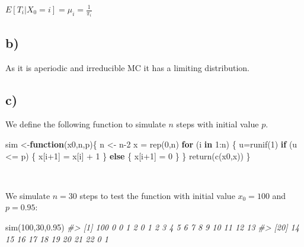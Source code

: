 \documentclass[
]{article}
\newenvironment{Shaded}{\begin{snugshade}}{\end{snugshade}}
\newcommand{\CommentTok}[1]{\textcolor[rgb]{0.56,0.35,0.01}{\textit{#1}}}
\newcommand{\ControlFlowTok}[1]{\textcolor[rgb]{0.13,0.29,0.53}{\textbf{#1}}}
\newcommand{\DecValTok}[1]{\textcolor[rgb]{0.00,0.00,0.81}{#1}}
\newcommand{\FloatTok}[1]{\textcolor[rgb]{0.00,0.00,0.81}{#1}}
\newcommand{\FunctionTok}[1]{\textcolor[rgb]{0.00,0.00,0.00}{#1}}
\newcommand{\NormalTok}[1]{#1}
\newcommand{\OtherTok}[1]{\textcolor[rgb]{0.56,0.35,0.01}{#1}}
\newcommand{\SpecialCharTok}[1]{\textcolor[rgb]{0.00,0.00,0.00}{#1}}
\begin{document}
\(E[T_{i}|X_{0} = i] = \mu_{i} = \frac{1}{\pi_{i}}\)

\hypertarget{b-1}{%
\subsection{b)}\label{b-1}}

As it is aperiodic and irreducible MC it has a limiting distribution.

\hypertarget{c-1}{%
\subsection{c)}\label{c-1}}

We define the following function to simulate \(n\) steps with initial
value \(p\).

\begin{Shaded}
\begin{Highlighting}[]
\NormalTok{sim }\OtherTok{\textless{}{-}}\ControlFlowTok{function}\NormalTok{(x0,n,p)\{ }
\NormalTok{    n }\OtherTok{\textless{}{-}}\NormalTok{ n}\DecValTok{{-}2}
\NormalTok{    x }\OtherTok{=} \FunctionTok{rep}\NormalTok{(}\DecValTok{0}\NormalTok{,n)}
    \ControlFlowTok{for}\NormalTok{ (i }\ControlFlowTok{in} \DecValTok{1}\SpecialCharTok{:}\NormalTok{n) \{}
\NormalTok{        u}\OtherTok{=}\FunctionTok{runif}\NormalTok{(}\DecValTok{1}\NormalTok{) }
        \ControlFlowTok{if}\NormalTok{ (u }\SpecialCharTok{\textless{}=}\NormalTok{ p) \{}
\NormalTok{            x[i}\SpecialCharTok{+}\DecValTok{1}\NormalTok{] }\OtherTok{=}\NormalTok{ x[i] }\SpecialCharTok{+} \DecValTok{1}
\NormalTok{        \} }\ControlFlowTok{else}\NormalTok{ \{}
\NormalTok{            x[i}\SpecialCharTok{+}\DecValTok{1}\NormalTok{] }\OtherTok{=} \DecValTok{0}
\NormalTok{        \}}
\NormalTok{    \} }
    \FunctionTok{return}\NormalTok{(}\FunctionTok{c}\NormalTok{(x0,x))}
\NormalTok{\}}
\end{Highlighting}
\end{Shaded}

~

We simulate \(n=30\) steps to test the function with initial value
\(x_{0} = 100\) and \(p=0.95\):

\begin{Shaded}
\begin{Highlighting}[]
\FunctionTok{sim}\NormalTok{(}\DecValTok{100}\NormalTok{,}\DecValTok{30}\NormalTok{,}\FloatTok{0.95}\NormalTok{)}
\CommentTok{\#\textgreater{}  [1] 100   0   0   1   2   0   1   2   3   4   5   6   7   8   9  10  11  12  13}
\CommentTok{\#\textgreater{} [20]  14  15  16  17  18  19  20  21  22   0   1}
\end{Highlighting}
\end{Shaded}
\end{document}
